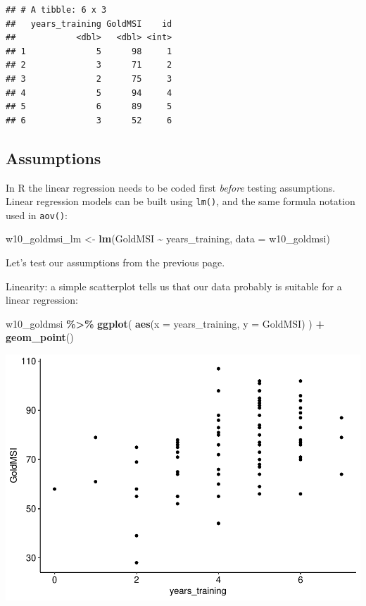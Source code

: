 \documentclass[
]{book}
\newenvironment{Shaded}{\begin{snugshade}}{\end{snugshade}}
\newcommand{\AttributeTok}[1]{\textcolor[rgb]{0.13,0.29,0.53}{#1}}
\newcommand{\FunctionTok}[1]{\textcolor[rgb]{0.13,0.29,0.53}{\textbf{#1}}}
\newcommand{\NormalTok}[1]{#1}
\newcommand{\OtherTok}[1]{\textcolor[rgb]{0.56,0.35,0.01}{#1}}
\newcommand{\SpecialCharTok}[1]{\textcolor[rgb]{0.81,0.36,0.00}{\textbf{#1}}}
\begin{document}
\begin{verbatim}
## # A tibble: 6 x 3
##   years_training GoldMSI    id
##            <dbl>   <dbl> <int>
## 1              5      98     1
## 2              3      71     2
## 3              2      75     3
## 4              5      94     4
## 5              6      89     5
## 6              3      52     6
\end{verbatim}

\subsection{Assumptions}\label{assumptions}

In R the linear regression needs to be coded first \emph{before} testing assumptions. Linear regression models can be built using \texttt{lm()}, and the same formula notation used in \texttt{aov()}:

\begin{Shaded}
\begin{Highlighting}[]
\NormalTok{w10\_goldmsi\_lm }\OtherTok{\textless{}{-}} \FunctionTok{lm}\NormalTok{(GoldMSI }\SpecialCharTok{\textasciitilde{}}\NormalTok{ years\_training, }\AttributeTok{data =}\NormalTok{ w10\_goldmsi)}
\end{Highlighting}
\end{Shaded}

Let's test our assumptions from the previous page.

Linearity: a simple scatterplot tells us that our data probably is suitable for a linear regression:

\begin{Shaded}
\begin{Highlighting}[]
\NormalTok{w10\_goldmsi }\SpecialCharTok{\%\textgreater{}\%}
  \FunctionTok{ggplot}\NormalTok{(}
    \FunctionTok{aes}\NormalTok{(}\AttributeTok{x =}\NormalTok{ years\_training, }\AttributeTok{y =}\NormalTok{ GoldMSI)}
\NormalTok{  ) }\SpecialCharTok{+}
  \FunctionTok{geom\_point}\NormalTok{()}
\end{Highlighting}
\end{Shaded}

\includegraphics{_main_files/figure-latex/unnamed-chunk-210-1.pdf}
\end{document}

